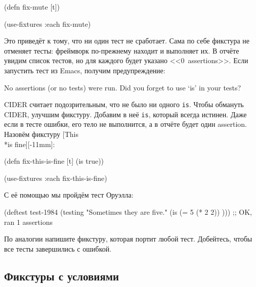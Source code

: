 \begin{english}
  \begin{clojure}
(defn fix-mute [t])

(use-fixtures :each fix-mute)
  \end{clojure}
\end{english}

Это приведёт к тому, что ни один тест не сработает. Сама по себе фикстура не
отменяет тесты: фреймворк по-прежнему находит и выполняет их. В отчёте увидим
список тестов, но для каждого будет указано <<0~assertions>>. Если запустить
тест из Emacs, получим предупреждение:

\begin{english}
  \begin{clojure}
No assertions (or no tests) were run.
Did you forget to use ‘is’ in your tests?
  \end{clojure}
\end{english}


CIDER считает подозрительным, что не было ни одного \verb|is|. Чтобы обмануть
CIDER, улучшим фикстуру. Добавим в неё \verb|is|, который всегда истинен. Даже
если в тесте ошибки, его тело не выполнится, а в отчёте будет один
assertion. Назовём фикстуру [This\\*is fine][-11mm]:

\begin{english}
  \begin{clojure}
(defn fix-this-is-fine [t]
  (is true))

(use-fixtures :each fix-this-is-fine)
  \end{clojure}
\end{english}


С её помощью мы пройдём тест Оруэлла:

\begin{english}
  \begin{clojure}
(deftest test-1984
  (testing "Sometimes they are five."
    (is (= 5 (* 2 2)) )))
;; OK, ran 1 assertions
  \end{clojure}
\end{english}

По аналогии напишите фикстуру, которая портит любой тест. Добейтесь, чтобы все
тесты завершились с ошибкой.

\subsection{Фикстуры с условиями}

